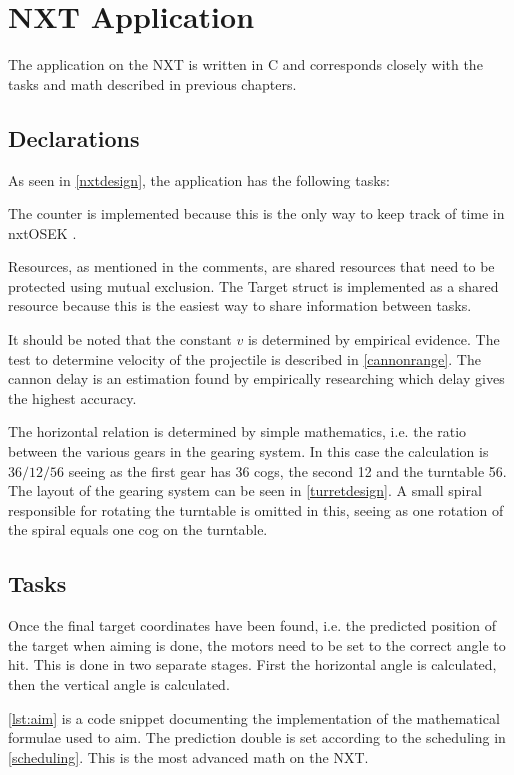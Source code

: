 \section{NXT Application}
The application on the NXT is written in C and corresponds closely with the tasks and math described in previous chapters.

\subsection{Declarations}
As seen in \autoref{nxtdesign}, the application has the following tasks:



The counter is implemented because this is the only way to keep track of time in nxtOSEK \cite{osek_spec}.

Resources, as mentioned in the comments, are shared resources that need to be protected using mutual exclusion. The Target struct is implemented as a shared resource because this is the easiest way to share information between tasks.

It should be noted that the constant $v$ is determined by empirical evidence. The test to determine velocity of the projectile is described in \autoref{cannonrange}. The cannon delay is an estimation found by empirically researching which delay gives the highest accuracy.

The horizontal relation is determined by simple mathematics, i.e. the ratio between the various gears in the gearing system. In this case the calculation is $36/12/56$ seeing as the first gear has 36 cogs, the second 12 and the turntable 56. The layout of the gearing system can be seen in \autoref{turretdesign}. A small spiral responsible for rotating the turntable is omitted in this, seeing as one rotation of the spiral equals one cog on the turntable.

\subsection{Tasks}
Once the final target coordinates have been found, i.e. the predicted position of the target when aiming is done, the motors need to be set to the correct angle to hit. This is done in two separate stages. First the horizontal angle is calculated, then the vertical angle is calculated.

\autoref{lst:aim} is a code snippet documenting the implementation of the mathematical formulae used to aim. The prediction double is set according to the scheduling in \autoref{scheduling}. This is the most advanced math on the NXT.

